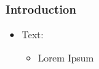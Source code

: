 \documentclass{beamer}
\begin{document}
\begin{frame}
    \frametitle{Introduction}
    \begin{itemize}
        \item Text:
        \begin{itemize}
            \item Lorem Ipsum 
        \end{itemize}
    \end{itemize} 
\end{frame}
\end{document}
